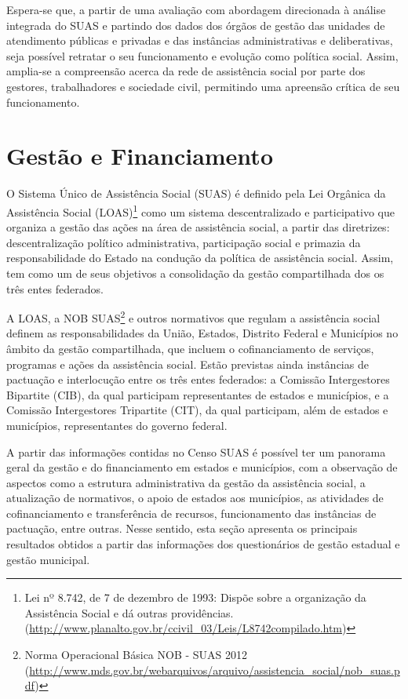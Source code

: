 \documentclass[
  brazilian]{report}
\begin{document}
Espera-se que, a partir de uma avaliação com abordagem direcionada à
análise integrada do SUAS e partindo dos dados dos órgãos de gestão das
unidades de atendimento públicas e privadas e das instâncias
administrativas e deliberativas, seja possível retratar o seu
funcionamento e evolução como política social. Assim, amplia-se a
compreensão acerca da rede de assistência social por parte dos gestores,
trabalhadores e sociedade civil, permitindo uma apreensão crítica de seu
funcionamento.

\hypertarget{gestuxe3o-e-financiamento}{%
\chapter{Gestão e Financiamento}\label{gestuxe3o-e-financiamento}}

O Sistema Único de Assistência Social (SUAS) é definido pela Lei
Orgânica da Assistência Social
(LOAS)\footnote{Lei nº 8.742, de 7 de dezembro de 1993: Dispõe sobre a organização da Assistência Social e dá outras providências. (\url{http://www.planalto.gov.br/ccivil_03/Leis/L8742compilado.htm})}
como um sistema descentralizado e participativo que organiza a gestão
das ações na área de assistência social, a partir das diretrizes:
descentralização político administrativa, participação social e primazia
da responsabilidade do Estado na condução da política de assistência
social. Assim, tem como um de seus objetivos a consolidação da gestão
compartilhada dos os três entes federados.

A LOAS, a NOB
SUAS\footnote{Norma Operacional Básica NOB - SUAS 2012 (\url{http://www.mds.gov.br/webarquivos/arquivo/assistencia_social/nob_suas.pdf})}
e outros normativos que regulam a assistência social definem as
responsabilidades da União, Estados, Distrito Federal e Municípios no
âmbito da gestão compartilhada, que incluem o cofinanciamento de
serviços, programas e ações da assistência social. Estão previstas ainda
instâncias de pactuação e interlocução entre os três entes federados: a
Comissão Intergestores Bipartite (CIB), da qual participam
representantes de estados e municípios, e a Comissão Intergestores
Tripartite (CIT), da qual participam, além de estados e municípios,
representantes do governo federal.

A partir das informações contidas no Censo SUAS é possível ter um
panorama geral da gestão e do financiamento em estados e municípios, com
a observação de aspectos como a estrutura administrativa da gestão da
assistência social, a atualização de normativos, o apoio de estados aos
municípios, as atividades de cofinanciamento e transferência de
recursos, funcionamento das instâncias de pactuação, entre outras. Nesse
sentido, esta seção apresenta os principais resultados obtidos a partir
das informações dos questionários de gestão estadual e gestão municipal.
\end{document}
